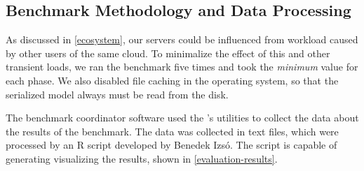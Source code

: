 \subsection{Benchmark Methodology and Data Processing}
\label{benchmark-methodology}

As discussed in \autoref{ecosystem}, our servers could be influenced from workload caused by other users of the same cloud. To minimalize the effect of this and other transient loads, we ran the benchmark five times and took the \emph{minimum} value for each phase. We also disabled file caching in the operating system, so that the serialized model always must be read from the disk.


The benchmark coordinator software used the \tb{}'s utilities to collect the data about the results of the benchmark. The data was collected in text files, which were  processed by an R script \cite{RProject} developed by Benedek Izsó. The script is capable of generating visualizing the results, shown in \autoref{evaluation-results}. 
